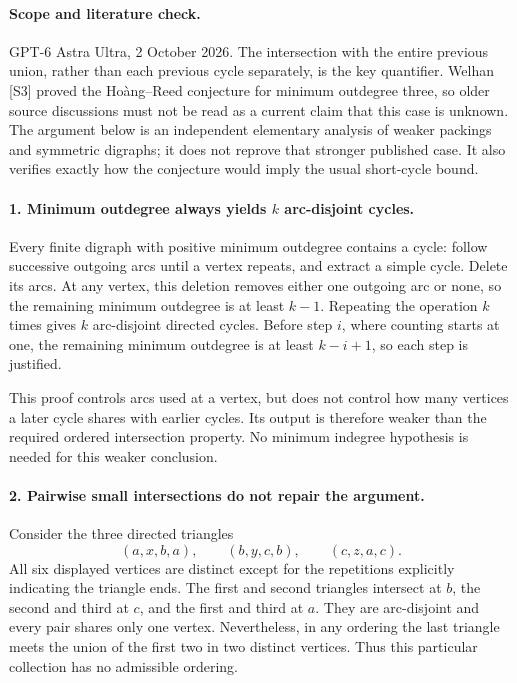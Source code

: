 \documentclass[11pt,a4paper]{article}
\begin{document}
\paragraph{Scope and literature check.}
GPT-6 Astra Ultra, 2 October 2026. The intersection with the entire
previous union, rather than each previous cycle separately, is the
key quantifier. Welhan [S3] proved the Ho\`ang--Reed conjecture for
minimum outdegree three, so older source discussions must not be
read as a current claim that this case is unknown. The argument
below is an independent elementary analysis of weaker packings and
symmetric digraphs; it does not reprove that stronger published case.
It also verifies exactly how the conjecture would imply the usual
short-cycle bound.

\paragraph{1. Minimum outdegree always yields $k$ arc-disjoint cycles.}
Every finite digraph with positive minimum outdegree contains a
cycle: follow successive outgoing arcs until a vertex repeats, and
extract a simple cycle. Delete its arcs. At any vertex, this deletion
removes either one outgoing arc or none, so the remaining minimum
outdegree is at least $k-1$. Repeating the operation $k$ times gives
$k$ arc-disjoint directed cycles. Before step $i$, where counting
starts at one, the remaining minimum outdegree is at least $k-i+1$,
so each step is justified.

This proof controls arcs used at a vertex, but does not control how
many vertices a later cycle shares with earlier cycles. Its output
is therefore weaker than the required ordered intersection property.
No minimum indegree hypothesis is needed for this weaker conclusion.

\paragraph{2. Pairwise small intersections do not repair the argument.}
Consider the three directed triangles
\[
 (a,x,b,a),\qquad (b,y,c,b),\qquad (c,z,a,c).
\]
All six displayed vertices are distinct except for the repetitions
explicitly indicating the triangle ends. The first and second
triangles intersect at $b$, the second and third at $c$, and the
first and third at $a$. They are arc-disjoint and every pair shares
only one vertex. Nevertheless, in any ordering the last triangle
meets the union of the first two in two distinct vertices. Thus
this particular collection has no admissible ordering.
\end{document}
